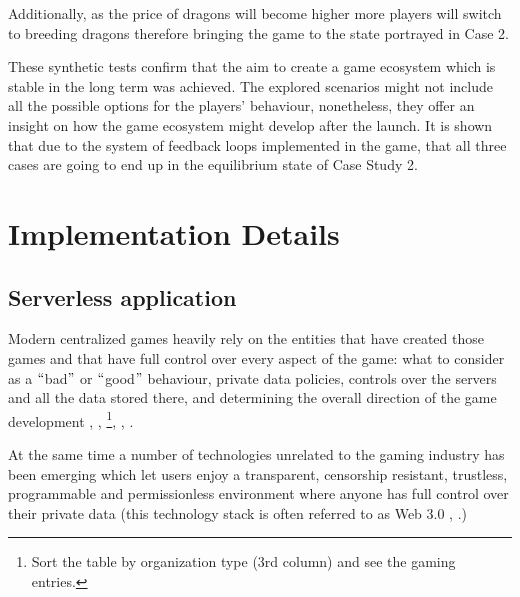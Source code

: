 \documentclass[12pt]{article}
\begin{document}
Additionally, as the price of dragons will become higher more players will switch to breeding dragons therefore bringing the game to the state portrayed in Case 2.\par

These synthetic tests confirm that the aim to create a game ecosystem which is stable in the long term was achieved. The explored scenarios might not include all the possible options for the players’ behaviour, nonetheless, they offer an insight on how the game ecosystem might develop after the launch. It is shown that due to the system of feedback loops implemented in the game, that all three cases are going to end up in the equilibrium state of Case Study 2.\par


\newpage

\vspace{\baselineskip}\section{Implementation Details}
\label{Implementation Details}  \par

\subsection{Serverless application}
\label{Serverless application} \par

Modern centralized games heavily rely on the entities that have created those games and that have full control over every aspect of the game: what to consider as a $``$bad$"$  or $``$good$"$  behaviour, private data policies, controls over the servers and all the data stored there, and determining the overall direction of the game development  \cite{Gogo_2018_Jun_16},  \cite{Steam_2017},  \cite{WikipediA_2018}\footnote{Sort the table by organization type (3rd column) and see the gaming entries.}, \cite{Ben_Gilbert_2018_Jun_22},  \cite{Aaron_Mamiit__2017_Mar_30}.\par

At the same time a number of technologies unrelated to the gaming industry has been emerging which let users enjoy a transparent, censorship resistant, trustless, programmable and permissionless environment where anyone has full control over their private data (this technology stack is often referred to as Web 3.0  \cite{Josh_Stark_2018_Jun_6},  \cite{Stephan_Tual_2017_May_26}.)\par
\end{document}

